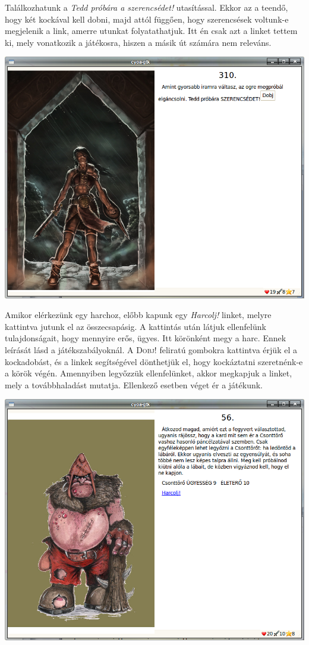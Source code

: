 \documentclass[12pt,a4paper,oneside]{report}
\newcommand{\stat}{\textsc}
\begin{document}
        Találkozhatunk a \emph{Tedd próbára a szerencsédet!}
        utasítással. Ekkor az a teendő, hogy két kockával kell dobni,
        majd attól függően, hogy szerencsések voltunk-e megjelenik a
        link, amerre utunkat folyatathatjuk. Itt én csak azt a linket
        tettem ki, mely vonatkozik a játékosra, hiszen a másik út
        számára nem releváns.

        \includegraphics[scale=0.5]{screenshot_006.png}

        Amikor elérkezünk egy harchoz, előbb kapunk egy \emph{Harcolj!}
        linket, melyre kattintva jutunk el az összecsapásig. A
        kattintás után látjuk ellenfelünk tulajdonságait, hogy
        mennyire erős, ügyes. Itt körönként megy a harc. Ennek
        leírását lásd a játékszabályoknál. A \stat{Dobj!} feliratú gombokra
        kattintva érjük el a kockadobást, és a linkek segítségével
        dönthetjük el, hogy kockáztatni szeretnénk-e a körök
        végén. Amennyiben legyőzzük ellenfelünket, akkor megkapjuk a
        linket, mely a továbbhaladást mutatja. Ellenkező esetben véget
        ér a játékunk.

        \includegraphics[scale=0.5]{screenshot_011.png}
\end{document}

